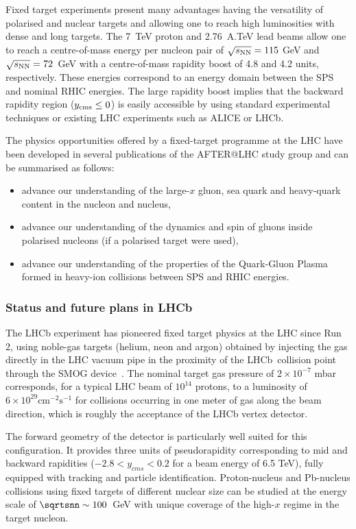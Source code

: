 \documentclass[../report.tex]{subfiles}
\begin{document}
Fixed target experiments present many advantages having the versatility of polarised and nuclear targets and allowing one to reach high luminosities with dense and long targets. The 7~TeV proton and 2.76~A.TeV lead beams allow one to reach a centre-of-mass energy per nucleon pair of $\sqrt{s_{\rm NN}} = 115$ GeV and $\sqrt{s_{\rm NN}} = 72$~GeV with a centre-of-mass rapidity boost of 4.8 and 4.2 units, respectively. These energies correspond to an energy domain between the SPS and nominal RHIC energies. The large rapidity boost implies that the backward rapidity region ($y_{\rm cms} \leq 0$) is easily accessible by using standard experimental techniques or existing LHC experiments such as ALICE or LHCb. 

The physics opportunities offered by a fixed-target programme at the LHC have been developed in several publications of the AFTER@LHC study group \cite{Brodsky:2012vg, Lansberg:Adv2015,Hadjidakis:2018ifr} and can be summarised as follows:
\begin{itemize}
\item{advance our understanding of the large-$x$ gluon, sea quark and heavy-quark content in the nucleon and nucleus,} 
\item{advance our understanding of the dynamics and spin of gluons inside polarised nucleons (if a polarised target were used),}
\item{advance our understanding of the properties of the Quark-Gluon Plasma formed in heavy-ion collisions between SPS and RHIC energies.}
\end{itemize}
 


\subsubsection{Status and future plans in LHCb}
\label{sec:FTLHCb}


The LHCb experiment has pioneered fixed target physics at the LHC since Run 2, 
using noble-gas targets (helium, neon and argon) obtained by injecting the gas directly in 
the LHC vacuum pipe in the proximity of the LHCb~collision point
through the SMOG device~\cite{smog}.
The nominal target gas pressure of $2 \times 10^{-7}$ mbar corresponds,
for a typical LHC beam of $10^{14}$ protons, to a luminosity of 
$6 \times 10^{29} \text{cm}^{-2}\text{s}^{-1}$ for collisions occurring in one
meter of gas along the beam direction, which is roughly the acceptance of the
LHCb vertex detector.

The forward geometry of the detector is particularly well suited for
this configuration.  It provides three units
of pseudorapidity corresponding to mid and backward rapidities ($-2.8 < y_{cms}< 0.2$
for a beam energy of 6.5 TeV), fully equipped with tracking and particle identification. 
Proton-nucleus and Pb-nucleus collisions using fixed targets of different
nuclear size can be studied at the energy scale of $\sqrtsnn \sim 100$~GeV
with unique coverage of the high-$x$ regime in the target nucleon.
\end{document}
